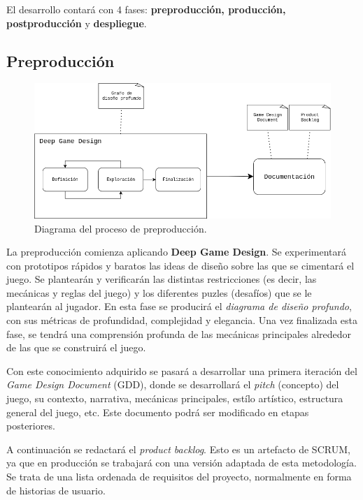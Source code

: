 El desarrollo contará con 4 fases: \textbf{preproducción, producción, postproducción} y \textbf{despliegue}.

\subsection{Preproducción}

\begin{figure}[H]
    \centering
    \includegraphics[scale=0.50]{img/preproduction.drawio.png}
    \caption[Diagrama de preproducción]{Diagrama del proceso de preproducción.}
    \label{fig:preproduction}
\end{figure}

La preproducción comienza aplicando \textbf{Deep Game Design}\cite{deepdesign}. Se experimentará con prototipos rápidos y baratos las ideas de diseño sobre las que se cimentará el juego. Se plantearán y verificarán las distintas restricciones (es decir, las mecánicas y reglas del juego) y los diferentes puzles (desafíos) que se le plantearán al jugador. En esta fase se producirá el \textit{diagrama de diseño profundo}, con sus métricas de profundidad, complejidad y elegancia. Una vez finalizada esta fase, se tendrá una comprensión profunda de las mecánicas principales alrededor de las que se construirá el juego.

Con este conocimiento adquirido se pasará a desarrollar una primera iteración del \textit{Game Design Document} (GDD), donde se desarrollará el \textit{pitch} (concepto) del juego, su contexto, narrativa, mecánicas principales, estílo artístico, estructura general del juego, etc. Este documento podrá ser modificado en etapas posteriores.

A continuación se redactará el \textit{product backlog}. Esto es un artefacto de SCRUM, ya que en producción se trabajará con una versión adaptada de esta metodología. Se trata de una lista ordenada de requisitos del proyecto, normalmente en forma de historias de usuario.

